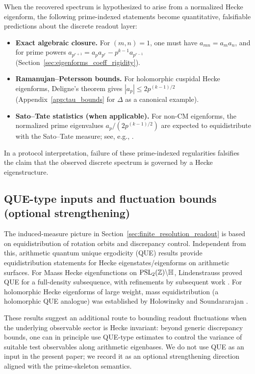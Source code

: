 When the recovered spectrum is hypothesized to arise from a normalized Hecke eigenform, the following prime-indexed statements become quantitative, falsifiable predictions about the discrete readout layer:
\begin{itemize}
\item \textbf{Exact algebraic closure.}
For $(m,n)=1$, one must have $a_{mn}=a_ma_n$, and for prime powers $a_{p^{r+1}}=a_pa_{p^r}-p^{k-1}a_{p^{r-1}}$ (Section~\ref{sec:eigenforms_coeff_rigidity}).
\item \textbf{Ramanujan--Petersson bounds.}
For holomorphic cuspidal Hecke eigenforms, Deligne's theorem gives $|a_p|\le 2p^{(k-1)/2}$ (Appendix~\ref{app:tau_bounds} for $\Delta$ as a canonical example).
\item \textbf{Sato--Tate statistics (when applicable).}
For non-CM eigenforms, the normalized prime eigenvalues $a_p/(2p^{(k-1)/2})$ are expected to equidistribute with the Sato--Tate measure; see, e.g., \cite{Clozel2006SatoTate,Harris2014SatoTate,BarnetLambGeeGeraghty2011}.
\end{itemize}
In a protocol interpretation, failure of these prime-indexed regularities falsifies the claim that the observed discrete spectrum is governed by a Hecke eigenstructure.

\subsection{QUE-type inputs and fluctuation bounds (optional strengthening)}
\label{app:que_connection}

The induced-measure picture in Section~\ref{sec:finite_resolution_readout} is based on equidistribution of rotation orbits and discrepancy control.
Independent from this, arithmetic quantum unique ergodicity (QUE) results provide equidistribution statements for Hecke eigenstates/eigenforms on arithmetic surfaces.
For Maass Hecke eigenfunctions on $\mathrm{PSL}_2(\mathbb{Z})\backslash\mathbb{H}$, Lindenstrauss proved QUE for a full-density subsequence, with refinements by subsequent work \cite{Lindenstrauss2006QUE}.
For holomorphic Hecke eigenforms of large weight, mass equidistribution (a holomorphic QUE analogue) was established by Holowinsky and Soundararajan \cite{HolowinskySoundararajan2010}.
\par
These results suggest an additional route to bounding readout fluctuations when the underlying observable sector is Hecke invariant: beyond generic discrepancy bounds, one can in principle use QUE-type estimates to control the variance of suitable test observables along arithmetic eigenbases.
We do not use QUE as an input in the present paper; we record it as an optional strengthening direction aligned with the prime-skeleton semantics.

